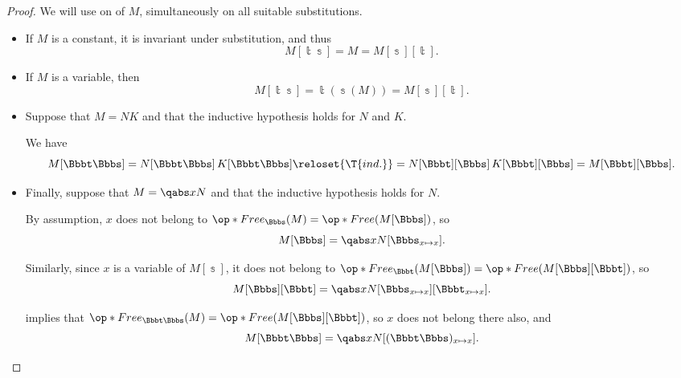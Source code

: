 \begin{proof}
  We will use  on of \( M \), simultaneously on all suitable substitutions.

  \begin{itemize}
    \item If \( M \) is a constant, it is invariant under substitution, and thus
    \begin{equation*}
      M[\Bbbt\Bbbs] = M = M[\Bbbs][\Bbbt].
    \end{equation*}

    \item If \( M \) is a variable, then
    \begin{equation*}
      M[\Bbbt\Bbbs] = \Bbbt(\Bbbs(M)) = M[\Bbbs][\Bbbt].
    \end{equation*}

    \item Suppose that \( M = NK \) and that the inductive hypothesis holds for \( N \) and \( K \).

    We have
    \begin{equation*}
      M[\Bbbt\Bbbs]
      =
      N[\Bbbt\Bbbs] \thinspace K[\Bbbt\Bbbs]
      \reloset {\T{ind.}} =
      N[\Bbbt][\Bbbs] \thinspace K[\Bbbt][\Bbbs]
      =
      M[\Bbbt][\Bbbs].
    \end{equation*}

    \item Finally, suppose that \( M = \qabs x N \) and that the inductive hypothesis holds for \( N \).

    By assumption, \( x \) does not belong to \( \op*{Free}_\Bbbs(M) = \op*{Free}(M[\Bbbs]) \), so
    \begin{equation*}
      M[\Bbbs] = \qabs x N[\Bbbs_{x \mapsto x}].
    \end{equation*}

    Similarly, since \( x \) is a variable of \( M[\Bbbs] \), it does not belong to \( \op*{Free}_\Bbbt(M[\Bbbs]) = \op*{Free}(M[\Bbbs][\Bbbt]) \), so
    \begin{equation*}
      M[\Bbbs][\Bbbt] = \qabs x N[\Bbbs_{x \mapsto x}][\Bbbt_{x \mapsto x}].
    \end{equation*}

     implies that \( \op*{Free}_{\Bbbt\Bbbs}(M) = \op*{Free}(M[\Bbbs][\Bbbt]) \), so \( x \) does not belong there also, and
    \begin{equation*}
      M[\Bbbt\Bbbs] = \qabs x N[(\Bbbt\Bbbs)_{x \mapsto x}].
    \end{equation*}


\end{itemize}
\end{proof}
